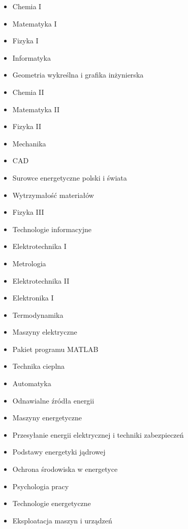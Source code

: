 \documentclass[a4paper,12pt]{article}
\begin{document}
\begin{multicols}{2}
\begin{itemize}
\item Chemia I
\item Matematyka I
\item Fizyka I
\item Informatyka
\item Geometria wykreślna i grafika inżynierska
\item Chemia II
\item Matematyka II
\item Fizyka II
\item Mechanika
\item CAD
\item Surowce energetyczne polski i świata
\item Wytrzymałość materiałów
\item Fizyka III
\item Technologie informacyjne
\item Elektrotechnika I
\item Metrologia
\item Elektrotechnika II
\item Elektronika I
\item Termodynamika
\item Maszyny elektryczne
\item Pakiet programu MATLAB
\item Technika cieplna
\item Automatyka
\item Odnawialne źródła energii
\item Maszyny energetyczne
\item Przesyłanie energii elektrycznej i techniki zabezpieczeń
\item Podstawy energetyki jądrowej
\item Ochrona środowiska w energetyce
\item Psychologia pracy
\item Technologie energetyczne
\item Eksploatacja maszyn i urządzeń
\end{itemize}
\end{multicols}
\end{document}
